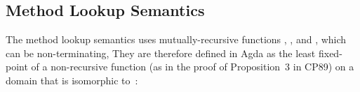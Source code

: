 \begin{AgdaAlign}
\subsection{Method Lookup Semantics}

The method lookup semantics uses mutually-recursive functions 
, , and ,
which can be non-terminating, 
They are therefore defined in Agda as the least fixed-point
of a non-recursive function 
(as in the proof of Proposition~3 in CP89) on a domain 
that is isomorphic to~:
%
\begin{code}%
%
\>[2]\AgdaSpace{}%
\AgdaSymbol{=}%
\>[8]\AgdaSymbol{(}\AgdaSpace{}%
\AgdaSpace{}%
\AgdaSpace{}%
\AgdaSpace{}%
\AgdaSpace{}%
\AgdaSpace{}%
\AgdaSymbol{)}\AgdaSpace{}%
\<%
\\
%
\>[8]\AgdaSymbol{(}\AgdaSpace{}%
\AgdaSpace{}%
\AgdaSpace{}%
\AgdaSpace{}%
\AgdaSpace{}%
\AgdaSpace{}%
\AgdaSpace{}%
\AgdaSpace{}%
\AgdaSymbol{)}\AgdaSpace{}%
\<%
\\
%
\>[8]\AgdaSymbol{(}\AgdaSpace{}%
\AgdaSpace{}%
\AgdaSpace{}%
\AgdaSpace{}%
\AgdaSpace{}%
\AgdaSpace{}%
\AgdaSpace{}%
\AgdaSpace{}%
\AgdaSpace{}%
\AgdaSpace{}%
\AgdaSymbol{)}\<%
\\
%
\\[\AgdaEmptyExtraSkip]%
%
\>[2]\AgdaSpace{}%
\AgdaModule{\AgdaUnderscore{}}\<%
\\
\>[2][@{}l@{\AgdaIndent{0}}]%
\>[6]\AgdaSymbol{\{}\AgdaSpace{}%
\AgdaSpace{}%
\AgdaSymbol{:}\AgdaSpace{}%
\AgdaSpace{}%
\AgdaSymbol{\}}\<%
\\
%
\>[6]\AgdaSymbol{\{\{}\AgdaSpace{}%
\AgdaSpace{}%
\AgdaSymbol{:}\AgdaSpace{}%
\AgdaSpace{}%
\AgdaSpace{}%
\AgdaSpace{}%
\AgdaSpace{}%
\AgdaSpace{}%
\AgdaSymbol{\}\}}\<%
\\
\>[2][@{}l@{\AgdaIndent{0}}]%
\>[4]\<%

\end{code}
\end{AgdaAlign}
